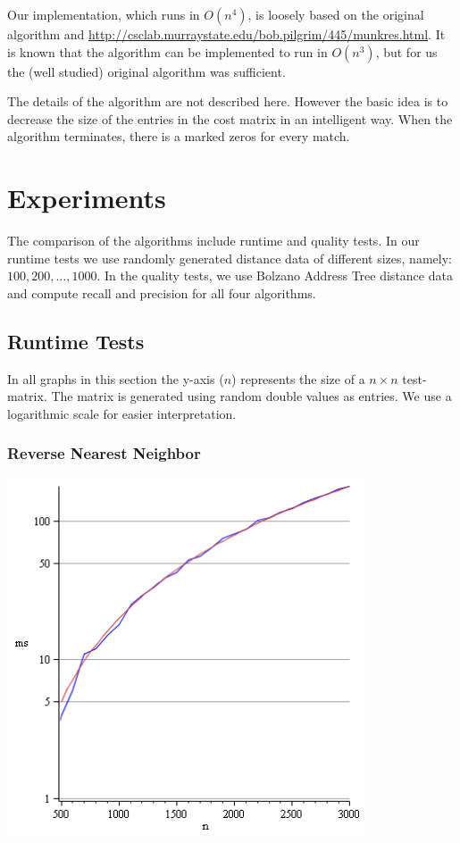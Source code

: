 \documentclass[a4paper,11pt]{article}
\begin{document}
Our implementation, which runs in $O(n^4)$, is loosely based on the original algorithm and  \url{http://csclab.murraystate.edu/bob.pilgrim/445/munkres.html}. It is known that the algorithm can be implemented to run in $O(n^3)$, but for us the (well studied) original algorithm was sufficient.

The details of the algorithm are not described here. However the basic idea is to decrease the size of the entries in the cost matrix in an intelligent way. When the algorithm terminates, there is a marked zeros for every match. 

\section{Experiments}

The comparison of the algorithms include runtime and quality tests. In our runtime tests we use randomly generated distance data of different sizes, namely: $100, 200, \dots, 1000$. In the quality tests, we use Bolzano Address Tree distance data and compute recall and precision for all four algorithms.

\subsection{Runtime Tests}

In all graphs in this section the y-axis ($n$) represents the size of a $n \times n$ test-matrix. The matrix is generated using random double values as entries. We use a logarithmic scale for easier interpretation.

\subsubsection{Reverse Nearest Neighbor}

\includegraphics[width=106mm]{RNN_runtime.png}
\end{document}
